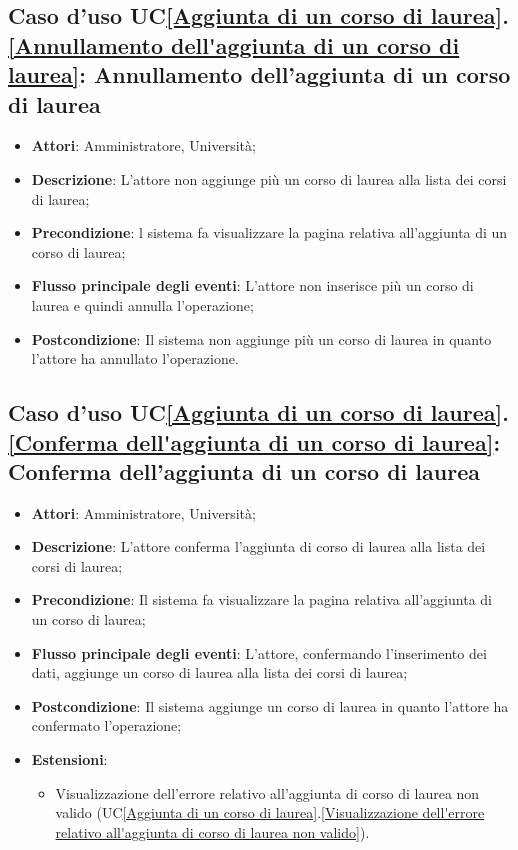 \subsection{Caso d'uso UC\ref{Aggiunta di un corso di laurea}.\ref{Annullamento dell'aggiunta di un corso di laurea}: Annullamento dell'aggiunta di un corso di laurea}
\begin{itemize}
	\item \textbf{Attori}: Amministratore, Università;
	\item \textbf{Descrizione}: L'attore non aggiunge più un corso di laurea alla lista dei corsi di laurea;
	
	\item \textbf{Precondizione}: l sistema fa visualizzare la pagina relativa all'aggiunta di un corso di laurea;
	
	\item \textbf{Flusso principale degli eventi}: L'attore non inserisce più un corso di laurea e quindi annulla l'operazione;
	
	\item \textbf{Postcondizione}: Il sistema non aggiunge più un corso di laurea in quanto l'attore ha annullato l'operazione.
	
\end{itemize}

\subsection{Caso d'uso UC\ref{Aggiunta di un corso di laurea}.\ref{Conferma dell'aggiunta di un corso di laurea}: Conferma dell'aggiunta di un corso di laurea}
\begin{itemize}
	\item \textbf{Attori}: Amministratore, Università;
	\item \textbf{Descrizione}: L'attore conferma l'aggiunta di corso di laurea alla lista dei corsi di laurea;
	
	\item \textbf{Precondizione}: Il sistema fa visualizzare la pagina relativa all'aggiunta di un corso di laurea;
	
	\item \textbf{Flusso principale degli eventi}: L'attore, confermando l'inserimento dei dati, aggiunge un corso di laurea alla lista dei corsi di laurea;
	
	\item \textbf{Postcondizione}: Il sistema aggiunge un corso di laurea in quanto l'attore ha confermato l'operazione;
	
	\item \textbf{Estensioni}:
	\begin{itemize}
		\item Visualizzazione dell'errore relativo all'aggiunta di corso di laurea non valido (UC\ref{Aggiunta di un corso di laurea}.\ref{Visualizzazione dell'errore relativo all'aggiunta di corso di laurea non valido}).
	\end{itemize}
\end{itemize}

